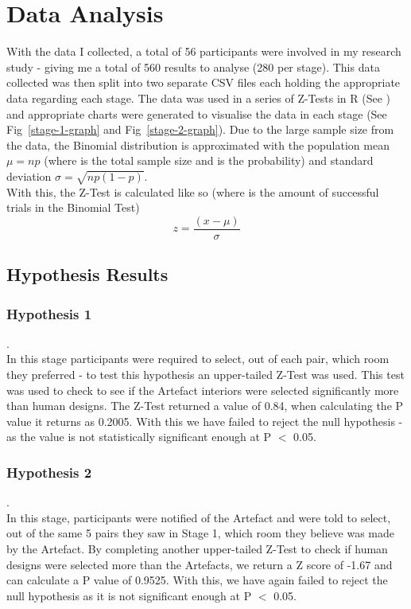 \section{Data Analysis}
With the data I collected, a total of 56 participants were involved in my research study - giving me a total of 560 results to analyse (280 per stage). This data collected was then split into two separate CSV files each holding the appropriate data regarding each stage. The data was used in a series of Z-Tests in R (See \hyperref[append:e]{}) and appropriate charts were generated to visualise the data in each stage (See Fig~\ref{stage-1-graph} and Fig~\ref{stage-2-graph}).
Due to the large sample size from the data, the Binomial distribution is approximated with the population mean \(\mu = np\) (where  is the total sample size and  is the probability) and standard deviation \(\sigma = \sqrt{np(1-p)}\).
\\
With this, the Z-Test is calculated like so (where  is the amount of successful trials in the Binomial Test) \cite[Chapter~6]{zar-jerrold}
\[z = \frac{(x - \mu ) }{\sigma }\]

\subsection{Hypothesis Results}
\subsubsection{Hypothesis 1}
.\\
In this stage participants were required to select, out of each pair, which room they preferred - to test this hypothesis an upper-tailed Z-Test was used.
This test was used to check to see if the Artefact interiors were selected significantly more than human designs. The Z-Test returned a value of 0.84, when calculating the P value it returns as 0.2005. With this we have failed to reject the null hypothesis - as the value is not statistically significant enough at P $<$ 0.05.
\\
\subsubsection{Hypothesis 2}
.\\
In this stage, participants were notified of the Artefact and were told to select, out of the same 5 pairs they saw in Stage 1, which room they believe was made by the Artefact. By completing another upper-tailed Z-Test to check if human designs were selected more than the Artefacts, we return a Z score of -1.67 and can calculate a P value of 0.9525. With this, we have again failed to reject the null hypothesis as it is not significant enough at P $<$ 0.05.

